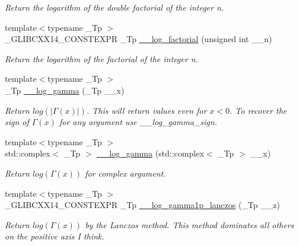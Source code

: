 \begin{DoxyCompactItemize}
\begin{DoxyCompactList}\small\item\em Return the logarithm of the double factorial of the integer n. \end{DoxyCompactList}\item 
{\footnotesize template$<$typename \+\_\+\+Tp $>$ }\\\+\_\+\+G\+L\+I\+B\+C\+X\+X14\+\_\+\+C\+O\+N\+S\+T\+E\+X\+PR \+\_\+\+Tp \hyperlink{namespacestd_1_1____detail_a2809419dbbe9fc60066dacfdc13761d4}{\+\_\+\+\_\+log\+\_\+factorial} (unsigned int \+\_\+\+\_\+n)
\begin{DoxyCompactList}\small\item\em Return the logarithm of the factorial of the integer n. \end{DoxyCompactList}\item 
{\footnotesize template$<$typename \+\_\+\+Tp $>$ }\\\+\_\+\+Tp \hyperlink{namespacestd_1_1____detail_aa8be6df2c5d12d0d1cb1f02a6b3592ef}{\+\_\+\+\_\+log\+\_\+gamma} (\+\_\+\+Tp \+\_\+\+\_\+x)
\begin{DoxyCompactList}\small\item\em Return $ log(|\Gamma(x)|) $. This will return values even for $ x < 0 $. To recover the sign of $ \Gamma(x) $ for any argument use {\itshape \+\_\+\+\_\+log\+\_\+gamma\+\_\+sign}. \end{DoxyCompactList}\item 
{\footnotesize template$<$typename \+\_\+\+Tp $>$ }\\std\+::complex$<$ \+\_\+\+Tp $>$ \hyperlink{namespacestd_1_1____detail_a48b62f07d0a6ec04dd9132a1cd7850c9}{\+\_\+\+\_\+log\+\_\+gamma} (std\+::complex$<$ \+\_\+\+Tp $>$ \+\_\+\+\_\+x)
\begin{DoxyCompactList}\small\item\em Return $ log(\Gamma(x)) $ for complex argument. \end{DoxyCompactList}\item 
{\footnotesize template$<$typename \+\_\+\+Tp $>$ }\\\+\_\+\+G\+L\+I\+B\+C\+X\+X14\+\_\+\+C\+O\+N\+S\+T\+E\+X\+PR \+\_\+\+Tp \hyperlink{namespacestd_1_1____detail_a7c30a619e78752c14417f05eaab283d3}{\+\_\+\+\_\+log\+\_\+gamma1p\+\_\+lanczos} (\+\_\+\+Tp \+\_\+\+\_\+z)
\begin{DoxyCompactList}\small\item\em Return $log(\Gamma(x))$ by the Lanczos method. This method dominates all others on the positive axis I think. \end{DoxyCompactList}\item 

\end{DoxyCompactItemize}
